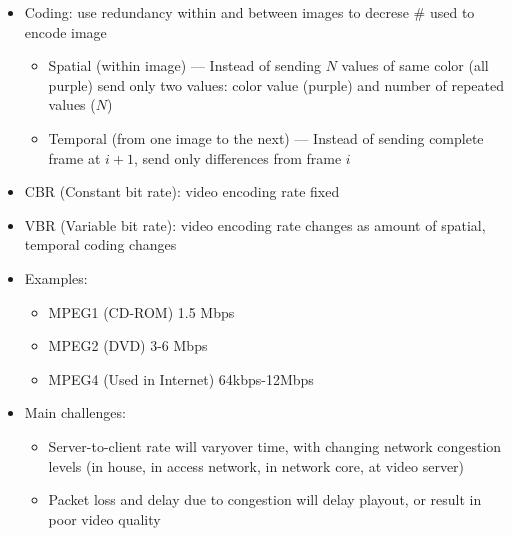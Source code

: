 \begin{itemize}
\begin{itemize}
      \item Coding: use redundancy within and between images to decrese \# used to encode image

        \begin{itemize}

          \item Spatial (within image) — Instead of sending $N$ values of same color (all purple) send only two values: color value (purple) and number of repeated values ($N$)

          \item Temporal (from one image to the next) — Instead of sending complete frame at $i+1$, send only differences from frame $i$

        \end{itemize}

      \item CBR (Constant bit rate): video encoding rate fixed

      \item VBR (Variable bit rate): video encoding rate changes as amount of spatial, temporal coding changes

      \item Examples:

        \begin{itemize}

          \item MPEG1 (CD-ROM) 1.5 Mbps

          \item MPEG2 (DVD) 3-6 Mbps

          \item MPEG4 (Used in Internet) 64kbps-12Mbps

        \end{itemize}

      \item Main challenges:

        \begin{itemize}

          \item Server-to-client rate will varyover time, with changing network congestion levels (in house, in access network, in network core, at video server)

          \item Packet loss and delay due to congestion will delay playout, or result in poor video quality

        \end{itemize}


\end{itemize}
\end{itemize}
